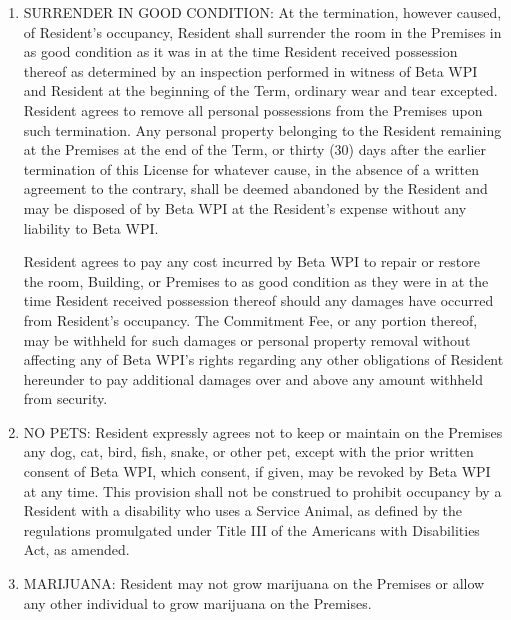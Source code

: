 \documentclass[legalpaper, 12pt]{article}
\begin{document}
\begin{enumerate}
        \item SURRENDER IN GOOD CONDITION\@: At the termination, however caused,
                of Resident’s occupancy, Resident shall surrender the room in
                the Premises in as good condition as it was in at the time
                Resident received possession thereof as determined by an
                inspection performed in witness of Beta WPI and Resident at the
                beginning of the Term, ordinary wear and tear excepted.
                Resident agrees to remove all personal possessions from the
                Premises upon such termination.  Any personal property belonging
                to the Resident remaining at the Premises at the end of the
                Term, or thirty (30) days after the earlier termination of this
                License for whatever cause, in the absence of a written
                agreement to the contrary, shall be deemed abandoned by the
                Resident and may be disposed of by Beta WPI at the Resident’s
                expense without any liability to Beta WPI\@.

                Resident agrees to pay any cost incurred by Beta WPI to repair
                or restore the room, Building, or Premises to as good condition
                as they were in at the time Resident received possession thereof
                should any damages have occurred from Resident’s occupancy.  The
                Commitment Fee, or any portion thereof, may be withheld for such
                damages or personal property removal without affecting any of
                Beta WPI’s rights regarding any other obligations of Resident
                hereunder to pay additional damages over and above any amount
                withheld from security.

        \item NO PETS\@:  Resident expressly agrees not to keep or maintain on the
                Premises any dog, cat, bird, fish, snake, or other pet, except
                with the prior written consent of Beta WPI, which consent, if
                given, may be revoked by Beta WPI at any time.  This provision
                shall not be construed to prohibit occupancy by a Resident with
                a disability who uses a Service Animal, as defined by the
                regulations promulgated under Title III of the Americans with
                Disabilities Act, as amended.

        \item MARIJUANA\@: Resident may not grow marijuana on the Premises or
                allow any other individual to grow marijuana on the Premises.


\end{enumerate}
\end{document}
